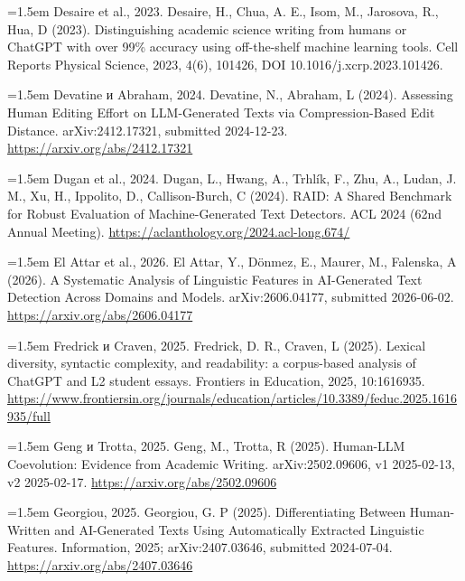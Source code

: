 \documentclass[11pt,a4paper]{article}
\renewcommand{\_}{\textunderscore\allowbreak}
\begin{document}
\noindent\hangindent=1.5em Desaire et al., 2023. Desaire, H., Chua, A. E., Isom, M., Jarosova, R., Hua, D (2023). Distinguishing academic science writing from humans or ChatGPT with over 99\% accuracy using off-the-shelf machine learning tools. Cell Reports Physical Science, 2023, 4(6), 101426, DOI 10.1016/j.xcrp.2023.101426.\par\smallskip

\noindent\hangindent=1.5em Devatine и Abraham, 2024. Devatine, N., Abraham, L (2024). Assessing Human Editing Effort on LLM-Generated Texts via Compression-Based Edit Distance. arXiv:2412.17321, submitted 2024-12-23. \url{https://arxiv.org/abs/2412.17321}\par\smallskip

\noindent\hangindent=1.5em Dugan et al., 2024. Dugan, L., Hwang, A., Trhl\'ik, F., Zhu, A., Ludan, J. M., Xu, H., Ippolito, D., Callison-Burch, C (2024). RAID: A Shared Benchmark for Robust Evaluation of Machine-Generated Text Detectors. ACL 2024 (62nd Annual Meeting). \url{https://aclanthology.org/2024.acl-long.674/}\par\smallskip

\noindent\hangindent=1.5em El Attar et al., 2026. El Attar, Y., D\"onmez, E., Maurer, M., Falenska, A (2026). A Systematic Analysis of Linguistic Features in AI-Generated Text Detection Across Domains and Models. arXiv:2606.04177, submitted 2026-06-02. \url{https://arxiv.org/abs/2606.04177}\par\smallskip

\noindent\hangindent=1.5em Fredrick и Craven, 2025. Fredrick, D. R., Craven, L (2025). Lexical diversity, syntactic complexity, and readability: a corpus-based analysis of ChatGPT and L2 student essays. Frontiers in Education, 2025, 10:1616935. \url{https://www.frontiersin.org/journals/education/articles/10.3389/feduc.2025.1616935/full}\par\smallskip

\noindent\hangindent=1.5em Geng и Trotta, 2025. Geng, M., Trotta, R (2025). Human-LLM Coevolution: Evidence from Academic Writing. arXiv:2502.09606, v1 2025-02-13, v2 2025-02-17. \url{https://arxiv.org/abs/2502.09606}\par\smallskip

\noindent\hangindent=1.5em Georgiou, 2025. Georgiou, G. P (2025). Differentiating Between Human-Written and AI-Generated Texts Using Automatically Extracted Linguistic Features. Information, 2025; arXiv:2407.03646, submitted 2024-07-04. \url{https://arxiv.org/abs/2407.03646}\par\smallskip
\end{document}
